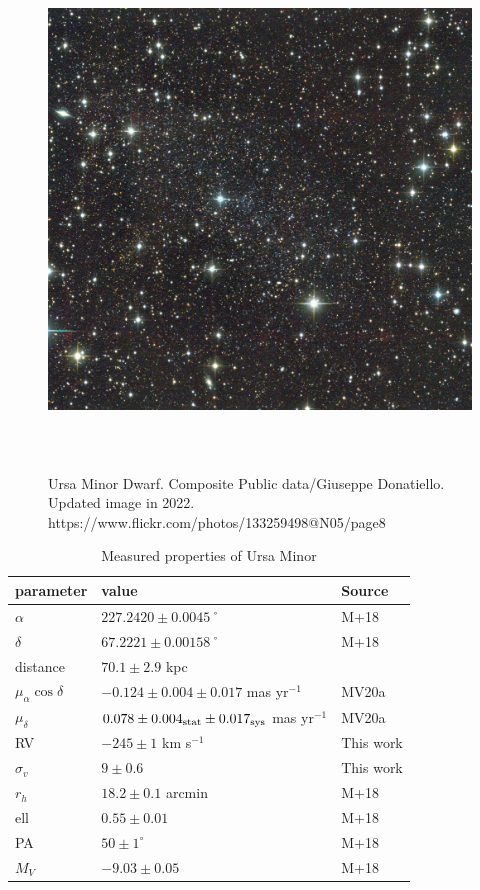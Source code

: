 \begin{figure}
\centering
\includegraphics[width=5.41667in,height=5.41667in]{figures/umi_image.jpg}
\caption[Picture of Ursa Minor]{Ursa Minor Dwarf. Composite Public
data/Giuseppe Donatiello. Updated image in 2022.
https://www.flickr.com/photos/133259498@N05/page8}\label{fig:umi_image}
\end{figure}

\begin{table}[t]
\centering
\caption{Measured properties of Ursa Minor}
\label{tbl:Measured-properties-of-Ursa-Minor}
\begin{tabular}{lll}
\toprule
parameter & value & Source\\
\midrule
$\alpha$ & $ 227.2420 \pm 0.0045$˚ & M+18\\
$\delta$ & $67.2221 \pm 0.00158$˚ & M+18\\
distance & $70.1 \pm 2.9$ kpc & \\
$\mu_\alpha \cos \delta$ & $-0.124 \pm 0.004 \pm 0.017$ mas yr$^{-1}$ & MV20a\\
$\mu_\delta$ & $0.078 \pm 0.004_{\rm stat} \pm 0.017_{\rm sys}$ mas yr$^{-1}$ & MV20a\\
RV & $-245 \pm 1$ km s$^{-1}$ & This work\\
$\sigma_v$ & $9 \pm 0.6$ & This work\\
$r_h$ & $18.2 \pm 0.1$ arcmin & M+18\\
ell & $0.55 \pm 0.01$ & M+18\\
PA & $50 \pm 1^\circ$ & M+18\\
$M_V$ & $-9.03 \pm 0.05$ & M+18\\
\bottomrule
\end{tabular}
\end{table}

